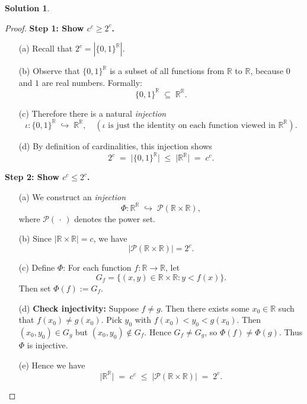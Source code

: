 \documentclass[12pt]{article}
\theoremstyle{definition} %
\newtheorem{solution}{Solution}
\theoremstyle{plain} %
\begin{document}
    \begin{solution}
        \begin{proof}
        \textbf{Step 1: Show $c^c \ge 2^c$.}
        \begin{enumerate}
            \item[(a)] Recall that $2^c = \left|\{0,1\}^{\mathbb{R}}\right|$.
            \item[(b)] Observe that $\{0,1\}^{\mathbb{R}}$ is a subset of all functions from $\mathbb{R}$ to $\mathbb{R}$, because $0$ and $1$ are real numbers. Formally:
            \[
               \{0,1\}^{\mathbb{R}} \;\subseteq\; \mathbb{R}^{\mathbb{R}}.
            \]
            \item[(c)] Therefore there is a natural \emph{injection}
            \[
               \iota:\{0,1\}^{\mathbb{R}} \;\hookrightarrow\; \mathbb{R}^{\mathbb{R}},
               \quad 
               (\iota \text{ is just the identity on each function viewed in } \mathbb{R}^{\mathbb{R}}).
            \]
            \item[(d)] By definition of cardinalities, this injection shows
            \[
               2^c \;=\; \bigl|\{0,1\}^{\mathbb{R}}\bigr|
               \;\le\;
               \bigl|\mathbb{R}^{\mathbb{R}}\bigr|
               \;=\;
               c^c.
            \]
        \end{enumerate}
        
        \textbf{Step 2: Show $c^c \le 2^c$.}
        \begin{enumerate}
            \item[(a)] We construct an \emph{injection}
            \[
               \Phi : \mathbb{R}^{\mathbb{R}} \;\hookrightarrow\; \mathcal{P}(\mathbb{R}\times \mathbb{R}),
            \]
            where $\mathcal{P}(\,\cdot\,)$ denotes the power set. 
            \item[(b)] Since $|\mathbb{R}\times\mathbb{R}| = c$, we have 
            \[
               \bigl|\mathcal{P}(\mathbb{R}\times\mathbb{R})\bigr| = 2^c.
            \]
            \item[(c)] Define $\Phi$: For each function $f: \mathbb{R} \to \mathbb{R}$, let
            \[
               G_f = \{(x,y) \in \mathbb{R}\times\mathbb{R} : y < f(x)\}.
            \]
            Then set $\Phi(f) := G_f$.
            \item[(d)] \textbf{Check injectivity:} Suppose $f \neq g$. Then there exists some $x_0 \in \mathbb{R}$ such that $f(x_0) \neq g(x_0)$. Pick $y_0$ with $f(x_0) < y_0 < g(x_0)$. Then $(x_0, y_0) \in G_g$ but $(x_0, y_0) \notin G_f$. Hence $G_f \neq G_g$, so $\Phi(f) \neq \Phi(g)$. Thus $\Phi$ is injective.
            \item[(e)] Hence we have 
            \[
               \bigl|\mathbb{R}^{\mathbb{R}}\bigr|
               \;=\;
               c^c
               \;\le\;
               \bigl|\mathcal{P}(\mathbb{R}\times \mathbb{R})\bigr|
               \;=\;
               2^c.
            \]
        \end{enumerate}
        

\end{proof}
\end{solution}
\end{document}
